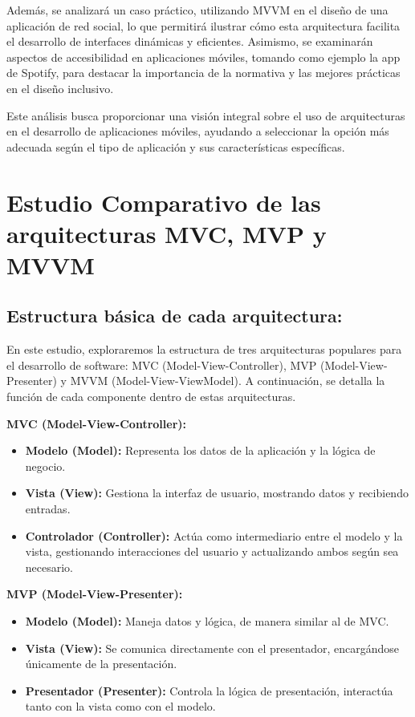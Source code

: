 \documentclass[letterpaper, 12pt]{report}
\begin{document}
Además, se analizará un caso práctico, utilizando MVVM en el diseño de una aplicación de red social, lo que permitirá ilustrar cómo esta arquitectura facilita el desarrollo de interfaces dinámicas y eficientes. Asimismo, se examinarán aspectos de accesibilidad en aplicaciones móviles, tomando como ejemplo la app de Spotify, para destacar la importancia de la normativa y las mejores prácticas en el diseño inclusivo.

Este análisis busca proporcionar una visión integral sobre el uso de arquitecturas en el desarrollo de aplicaciones móviles, ayudando a seleccionar la opción más adecuada según el tipo de aplicación y sus características específicas.

\newpage

\section{Estudio Comparativo de las arquitecturas MVC, MVP y MVVM}

\subsection{Estructura básica de cada arquitectura:}

En este estudio, exploraremos la estructura de tres arquitecturas populares para el desarrollo de software: MVC (Model-View-Controller), MVP (Model-View-Presenter) y MVVM (Model-View-ViewModel). A continuación, se detalla la función de cada componente dentro de estas arquitecturas.

\textbf{MVC (Model-View-Controller):}
\begin{itemize}
    \item \textbf{Modelo (Model):} Representa los datos de la aplicación y la lógica de negocio.
    \item \textbf{Vista (View):} Gestiona la interfaz de usuario, mostrando datos y recibiendo entradas.
    \item \textbf{Controlador (Controller):} Actúa como intermediario entre el modelo y la vista, gestionando interacciones del usuario y actualizando ambos según sea necesario.
\end{itemize}

\textbf{MVP (Model-View-Presenter):}
\begin{itemize}
    \item \textbf{Modelo (Model):} Maneja datos y lógica, de manera similar al de MVC.
    \item \textbf{Vista (View):} Se comunica directamente con el presentador, encargándose únicamente de la presentación.
    \item \textbf{Presentador (Presenter):} Controla la lógica de presentación, interactúa tanto con la vista como con el modelo.
\end{itemize}
\end{document}
